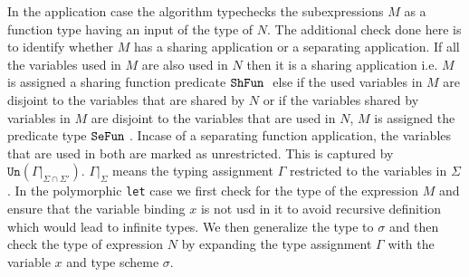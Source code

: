 In the application case the algorithm typechecks the subexpressions $M$ as a function type having
an input of the type of $N$. The additional check done here is to identify whether $M$ has a sharing
application or a separating application. If all the variables used in $M$ are also used in $N$ then
it is a sharing application i.e. $M$ is assigned a sharing function predicate $\texttt{ShFun}\ $
else if the used variables in $M$ are disjoint to the variables that
are shared by $N$ or if the variables shared by variables in $M$ are disjoint to the variables
that are used in $N$, $M$ is assigned the predicate type $\texttt{SeFun}\ $. Incase of a separating function
application, the variables that are used in both are marked as unrestricted. This is captured by
$\texttt{Un}(\Gamma|_{\Sigma \cap \Sigma'})$. $\Gamma|_{\Sigma}$ means the typing assignment $\Gamma$
restricted to the variables in $\Sigma$.
In the polymorphic \texttt{let} case we first check for the type of the expression $M$ and
ensure that the variable binding $x$ is not usd in it to avoid recursive definition which would
lead to infinite types. We then generalize the type to $\sigma$ and then check the type of expression $N$
by expanding the type assignment $\Gamma$ with the variable $x$ and type scheme $\sigma$.


